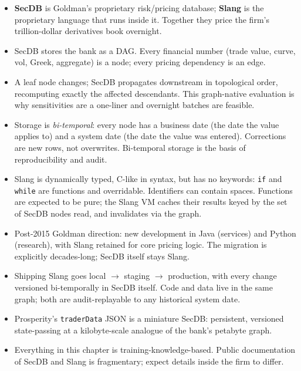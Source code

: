 \begin{keyfactbox}
\begin{itemize}
  \item \textbf{SecDB} is Goldman's proprietary
    risk/pricing database; \textbf{Slang} is the proprietary
    language that runs inside it.  Together they price the
    firm's trillion-dollar derivatives book overnight.
  \item SecDB stores the bank as a DAG.  Every financial
    number (trade value, curve, vol, Greek, aggregate) is a
    node; every pricing dependency is an edge.
  \item A leaf node changes; SecDB propagates downstream in
    topological order, recomputing exactly the affected
    descendants.  This graph-native evaluation is why
    sensitivities are a one-liner and overnight batches are
    feasible.
  \item Storage is \emph{bi-temporal}: every node has a business
    date (the date the value applies to) and a system date (the
    date the value was entered).  Corrections are new rows, not
    overwrites.  Bi-temporal storage is the basis of
    reproducibility and audit.
  \item Slang is dynamically typed, C-like in syntax, but has
    no keywords: \texttt{if} and \texttt{while} are functions
    and overridable.  Identifiers can contain spaces.  Functions
    are expected to be pure; the Slang VM caches their results
    keyed by the set of SecDB nodes read, and invalidates via the
    graph.
  \item Post-2015 Goldman direction: new development in Java
    (services) and Python (research), with Slang retained for
    core pricing logic.  The migration is explicitly decades-long;
    SecDB itself stays Slang.
  \item Shipping Slang goes local $\to$ staging $\to$ production,
    with every change versioned bi-temporally in SecDB itself.
    Code and data live in the same graph; both are audit-replayable
    to any historical system date.
  \item Prosperity's \texttt{traderData} JSON is a miniature
    SecDB: persistent, versioned state-passing at a
    kilobyte-scale analogue of the bank's petabyte graph.
  \item Everything in this chapter is
    training-knowledge-based.  Public documentation of SecDB
    and Slang is fragmentary; expect details inside the firm to
    differ.
\end{itemize}
\end{keyfactbox}
